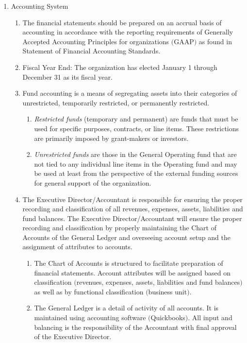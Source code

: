 \documentclass{article}
\begin{document}
\begin{enumerate}
\begin{enumerate}
\begin{enumerate}
\end{enumerate}
\item Accounting System
\begin{enumerate}
\item The financial statements should be prepared on an accrual basis of accounting in accordance with the reporting requirements of Generally Accepted Accounting Principles for organizations $($GAAP$)$ as found in Statement of Financial Accounting Standards.
\item Fiscal Year End: The organization has elected January 1 through December 31 as its fiscal year.
\item Fund accounting is a means of segregating assets into their categories of unrestricted, temporarily restricted, or permanently restricted. 
\begin{enumerate}
\item  {\it Restricted funds} (temporary and permanent) are funds that must be used for specific purposes, contracts, or line items. These restrictions are primarily imposed by grant-makers or investors.
\item {\it Unrestricted funds} are those in the General Operating fund that are not tied to any individual line items in the Operating fund and may be used at least from the perspective of the external funding sources for general support of the organization. 
\end{enumerate}
\item The Executive Director/Accountant is responsible for ensuring the proper recording and classification of all revenues, expenses, assets, liabilities and fund balances. The Executive Director/Accountant will ensure the proper recording and classification by properly maintaining the Chart of Accounts of the General Ledger and overseeing account setup and the assignment of attributes to accounts.
\begin{enumerate}
\item The Chart of Accounts is structured to facilitate preparation of financial statements. Account attributes will be assigned based on classification $($revenues, expenses, assets, liabilities and fund balances$)$ as well as by functional classification $($business unit$)$.
\item The General Ledger is a detail of activity of all accounts.  It is maintained using accounting software $($Quickbooks$)$. All input and balancing is the responsibility of the Accountant with final approval of the Executive Director.
\end{enumerate}

\end{enumerate}
\end{enumerate}
\end{enumerate}
\end{document}
